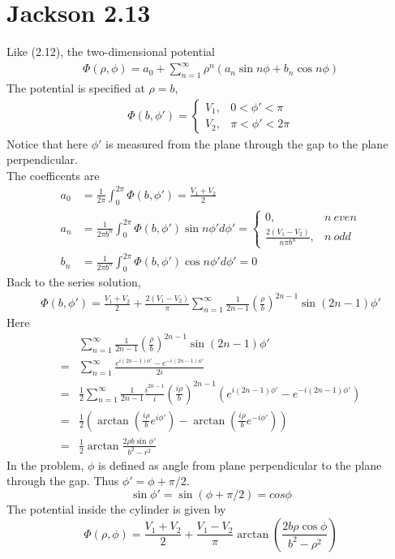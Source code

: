 \documentclass[notitlepage]{revtex4-1}
\begin{document}
\section*{Jackson 2.13}

Like (2.12), the two-dimensional potential
%
\begin{align*}
  \Phi(\rho,\phi)=a_0+\sum^{\infty}_{n=1}\rho^n(a_n\sin n\phi+b_n\cos n\phi)
\end{align*}
%
The potential is specified at $\rho=b$,
%
\begin{align*}
  \Phi(b,\phi')=
  \begin{cases}
    V_1, & 0<\phi'<\pi\\
    V_2, & \pi<\phi'<2\pi
  \end{cases}
\end{align*}
Notice that here $\phi'$ is measured from the plane through the gap to the plane perpendicular.\\
The coefficents are
\begin{align*}
  a_0&=\frac{1}{2\pi}\int^{2\pi}_0\Phi(b,\phi')=\frac{V_1+V_2}{2}\\
  a_n&=\frac{1}{2\pi b^n}\int^{2\pi}_0\Phi(b,\phi')\sin n\phi' d\phi'=
  \begin{cases}
    0, & n\ even\\
    \frac{2(V_1-V_2)}{n\pi b^n}, & n\ odd
  \end{cases}\\
  b_n&=\frac{1}{2\pi b^n}\int^{2\pi}_0\Phi(b,\phi')\cos n\phi' d\phi'=0
\end{align*}
Back to the series solution,
\begin{align*}
  \Phi(b,\phi')=\frac{V_1+V_2}{2}+\frac{2(V_1-V_2)}{\pi}\sum^{\infty}_{n=1}\frac{1}{2n-1}(\frac{\rho}{b})^{2n-1}\sin (2n-1)\phi'
\end{align*}
Here
\begin{align*}
  &\sum^{\infty}_{n=1}\frac{1}{2n-1}(\frac{\rho}{b})^{2n-1}\sin (2n-1)\phi'\\
  =&\sum^{\infty}_{n=1}\frac{e^{i(2n-1)\phi'}-e^{-i(2n-1)\phi'}}{2i}\\
  =&\frac{1}{2}\sum^{\infty}_{n=1}\frac{1}{2n-1}\frac{i^{2n-1}}{i}(\frac{i\rho}{b})^{2n-1}(e^{i(2n-1)\phi'}-e^{-i(2n-1)\phi'})\\
  =&\frac{1}{2}(\arctan(\frac{i\rho}{b}e^{i\phi'})-\arctan(\frac{i\rho}{b}e^{-i\phi'}))\\
  =&\frac{1}{2}\arctan\frac{2\rho b\sin\phi'}{b^2-r^2}
\end{align*}
In the problem, $\phi$ is defined as angle from plane perpendicular to the plane through the gap. Thus $\phi'=\phi+\pi/2$.
\[ \sin\phi'=\sin(\phi+\pi/2)=cos\phi \]
The potential inside the cylinder is given by
\[ \Phi(\rho,\phi)=\frac{V_1+V_2}{2}+\frac{V_1-V_2}{\pi}\arctan(\frac{2b\rho\cos\phi}{b^2-\rho^2}) \]
\pagebreak
\end{document}
